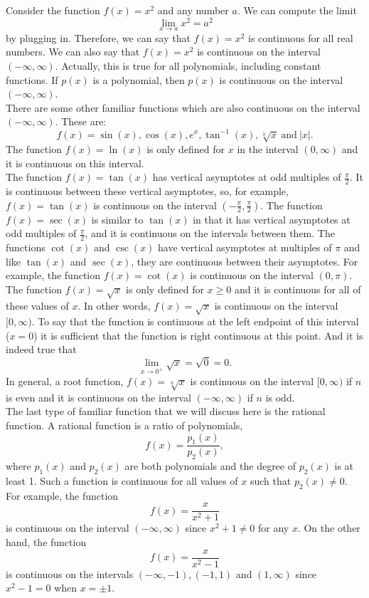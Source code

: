 \documentclass[handout]{ximera}
\begin{document}
Consider the function $f(x) = x^2$ and any number $a$. We can compute the limit 
\[\lim_{x \to a} x^2 = a^2\]
by plugging in. Therefore, we can say that $f(x) = x^2$ is continuous for all real numbers.
We can also say that $f(x) = x^2$ is continuous on the interval $(-\infty, \infty)$.
Actually, this is true for all polynomials, including constant functions.
If $p(x)$ is a polynomial, then $p(x)$ is continuous on the interval $(-\infty, \infty)$.\\
There are some other familiar functions which are also continuous on the interval $(-\infty, \infty)$.
These are: 
\[f(x) = \sin(x), \cos(x), e^x, \tan^{-1}(x), \sqrt[3] x \ \text{and} \ |x|.\]
The function $f(x) = \ln(x)$ is only defined for $x$ in the interval $(0, \infty)$ and it is 
continuous on this interval.\\
The function $f(x) = \tan(x)$ has vertical asymptotes at odd multiples of $\frac{\pi}{2}$. 
It is continuous between these vertical asymptotes, so, for example, $f(x) = \tan(x)$ is continuous on the 
interval $(-\frac{\pi}{2},\frac{\pi}{2})$.
The function $f(x) = \sec(x)$ is similar to $\tan(x)$ in that it has vertical asymptotes at odd 
multiples of $\frac{\pi}{2}$, and it is continuous on the intervals between them.
The functions $\cot(x)$ and $\csc(x)$ have vertical asymptotes at multiples of $\pi$ and like 
$\tan(x)$ and $\sec(x)$, they are continuous between their asymptotes. For example, the function
$f(x) = \cot(x)$ is continuous on the interval $(0, \pi)$.\\



The function $f(x) = \sqrt x$ is only defined for $x \geq 0$ and it is continuous for all of these values of $x$.
In other words, $f(x) = \sqrt x$ is continuous on the interval $[0, \infty)$. 
To say that the function is continuous at the left endpoint of this interval ($x = 0$) it is sufficient 
that the function is right continuous at this point. And it is indeed true that
\[\lim_{x \to 0^+} \sqrt x = \sqrt 0 = 0.\]
In general, a root function, $f(x) = \sqrt[n] x$ is continuous on the interval $[0, \infty)$ if $n$ is even and 
it is continuous on the interval $(-\infty, \infty)$ if $n$ is odd.\\

The last type of familiar function that we will discuss here is the rational function.  
A rational function is a ratio of polynomials, 
\[f(x) = \frac{p_1(x)}{p_2(x)}, \]
where $p_1(x)$ and $p_2(x)$ are both polynomials and the degree of $p_2(x)$ is at least 1.
Such a function is continuous for all values of $x$ such that $p_2(x) \neq 0$.
For example, the function
\[f(x) = \frac{x}{x^2 + 1}\]
is continuous on the interval $(-\infty, \infty)$ since $x^2 + 1 \neq 0$ for any $x$.
On the other hand, the function
\[f(x) = \frac{x}{x^2 - 1}\]
is continuous on the intervals $(-\infty, -1), (-1, 1)$ and $(1, \infty)$ since $ x^2 - 1 = 0$
when $x = \pm 1$.
\end{document}
